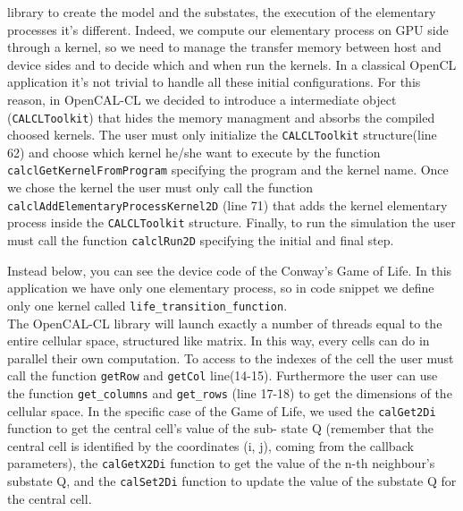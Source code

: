 library to create the model and the substates, the execution of the
elementary processes it's different. Indeed, we compute our elementary
process on GPU side through a kernel, so we need to manage the
transfer memory between host and device sides and to decide which and
when run the kernels. In a classical OpenCL application it's not
trivial to handle all these initial configurations.  For this reason,
in OpenCAL-CL we decided to introduce a intermediate object
(\verb'CALCLToolkit') that hides the memory managment and absorbs the
compiled choosed kernels. The user must only initialize the
\verb'CALCLToolkit' structure(line 62) and choose which kernel he/she
want to execute by the function \verb'calclGetKernelFromProgram'
specifying the program and the kernel name. Once we chose the kernel
the user must only call the function
\verb'calclAddElementaryProcessKernel2D' (line 71) that adds the
kernel elementary process inside the \verb'CALCLToolkit'
structure. Finally, to run the simulation the user must call the function
\verb'calclRun2D' specifying the initial and final step.

Instead below, you can see the device code of the Conway’s Game of
Life.  In this application we have only one elementary process, so in
code snippet we define only one kernel called
\verb'life_transition_function'.\\ The OpenCAL-CL library will launch
exactly a number of threads equal to the entire cellular space,
structured like matrix. In this way, every cells can do in parallel
their own computation.  To access to the indexes of the cell the user
must call the function \verb'getRow' and \verb'getCol'
line(14-15). Furthermore the user can use the function
\verb'get_columns' and \verb'get_rows' (line 17-18) to get the
dimensions of the cellular space.  In the specific case of the Game of
Life, we used the \verb'calGet2Di' function to get the central cell’s value of the sub-
state Q (remember that the central cell is identified by the coordinates (i, j), coming from the callback parameters), the \verb'calGetX2Di' function to get the value
of the n-th neighbour’s substate Q, and the \verb'calSet2Di' function to update the
value of the substate Q for the central cell. 



